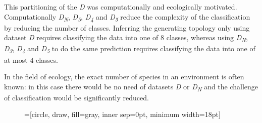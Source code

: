\documentclass[letterpaper, 10 pt, conference]{ieeeconf}  %
\begin{document}
This partitioning of the \textit{D} was computationally and ecologically motivated. Computationally \textit{D\textsubscript{N}}, \textit{D\textsubscript{3}}, \textit{D\textsubscript{4}} and \textit{D\textsubscript{5}} reduce the complexity of the classification by reducing the number of classes. Inferring the generating topology only using dataset \textit{D} requires classifying the data into one of 8 classes, whereas using \textit{D\textsubscript{N}}, \textit{D\textsubscript{3}}, \textit{D\textsubscript{4}} and \textit{D\textsubscript{5}} to do the same prediction requires classifying the data into one of at most 4 classes.

In the field of ecology, the exact number of species in an environment is often known: in this case there would be no need of datasets \textit{D} or \textit{D\textsubscript{N}} and the challenge of classification would be significantly reduced. 

\begin{figure}
	\centering
	=[circle, draw, fill=gray,
                        inner sep=0pt, minimum width=18pt]
\end{figure}    
    
\end{document}
